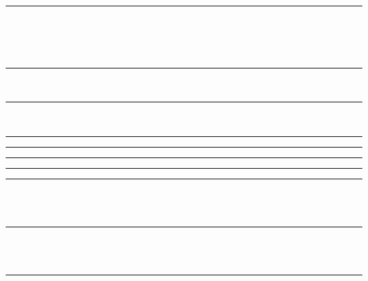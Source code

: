 \documentclass{article}
\begin{document}
\hrule
\begin{code}%
\>[0]\<%
\\
\>[0]\<%
\\
\>[0][@{}l@{\AgdaIndent{0}}]%
\>[2]\AgdaSpace{}%
\AgdaSymbol{:}\AgdaSpace{}%
\<%
\\
%
\>[2]\AgdaSpace{}%
\AgdaSymbol{:}\AgdaSpace{}%
\<%
\end{code}
\hrule
\begin{code}%
\>[0]\<%
\\
\>[0]\<%
\end{code}
\hrule
\begin{code}%
\>[0]\<%
\\
\>[0]\<%
\end{code}
\hrule
\begin{code}%
\>[0]\<%
\end{code}
\hrule
\begin{code}  %
\>[0]\<%
\end{code}
\hrule
  \begin{code}  %
\>[0]\<%
\end{code}
\hrule
  \begin{code}  %
\>[0]\<%
\end{code}
\hrule
\begin{code}%
\>[0]\AgdaSpace{}%
\AgdaModule{\AgdaUnderscore{}}\AgdaSpace{}%
\<%
\end{code}
\begin{code}%
\>[0]\<%
\\
\>[0][@{}l@{\AgdaIndent{1}}]%
\>[2]\<%
\\
\>[2][@{}l@{\AgdaIndent{0}}]%
\>[4]\AgdaSpace{}%
\AgdaSymbol{:}\AgdaSpace{}%
\<%
\end{code}
\hrule
\begin{AgdaAlign}
\begin{code}%
\>[0]\<%
\\
\>[0][@{}l@{\AgdaIndent{0}}]%
\>[2]%
\>[5]\AgdaSymbol{:}\AgdaSpace{}%
\AgdaSpace{}%
\AgdaSpace{}%
\<%
\\
%
\>[2]%
\>[5]\AgdaSymbol{:}%
\>[11I]\<%
\end{code}
\begin{code}%
\>[11I][@{}l@{\AgdaIndent{1}}]%
\>[10]\<%
\end{code}
\end{AgdaAlign}
\hrule
\end{document}
